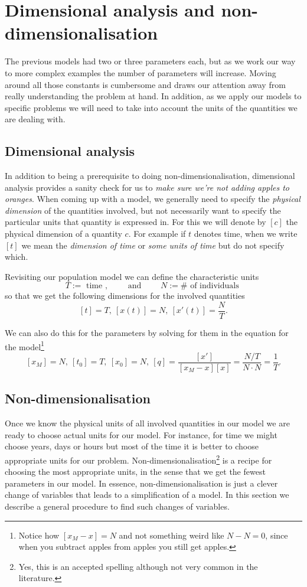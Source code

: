 \section{Dimensional analysis and non-dimensionalisation}

The previous models had two or three parameters each, but as we work our way to
more complex examples the number of parameters will increase. Moving around all
those constants is cumbersome and draws our attention away from really
understanding the problem at hand. In addition, as we apply our models to
specific problems we will need to take into account the units of the quantities
we are dealing with.

\subsection{Dimensional analysis}

In addition to being a prerequisite to doing non-dimensionalisation,
dimensional analysis provides a sanity check for us to \textit{make sure we're
not adding apples to oranges}. When coming up with a model, we generally need
to specify the \textit{physical dimension} of the quantities involved, but not
necessarily want to specify the particular units that quantity is expressed in.
For this we will denote by $[c]$ the physical dimension of a quantity $c$. For
example if $t$ denotes time, when we write $[t]$ we mean the \textit{dimension
of time} or \textit{some units of time} but do not specify which.

Revisiting our population model we can define the characteristic units
\[
  T := \text{ time },\qquad \text{ and } \qquad N := \# \text{ of individuals }
\]
so that we get the following dimensions for the involved quantities
\[
  [t] = T,\ [x(t)] = N,\ [x'(t)] = \frac{N}{T}.
\]

We can also do this for the parameters by solving for them in the equation for
the model\footnote{Notice how $[x_M - x] = N$ and not something weird like $N -
N = 0$, since when you subtract apples from apples you still get apples.}
\[
  [x_M] = N,\ [t_0] = T,\ [x_0] = N,\ 
  [q] = \frac{[x']}{[x_M - x][x]} = \frac{N / T}{N \cdot N} = \frac{1}{T}. 
\]

\subsection{Non-dimensionalisation}

Once we know the physical units of all involved quantities in our model we are
ready to choose actual units for our model. For instance, for time we might
choose years, days or hours but most of the time it is better to choose
appropriate units for our problem. Non-dimensionalisation\footnote{Yes, this is
an accepted spelling although not very common in the literature.} is a recipe
for choosing the most appropriate units, in the sense that we get the fewest
parameters in our model. In essence, non-dimensionalisation is just a clever
change of variables that leads to a simplification of a model. In this section
we describe a general procedure to find such changes of variables.



